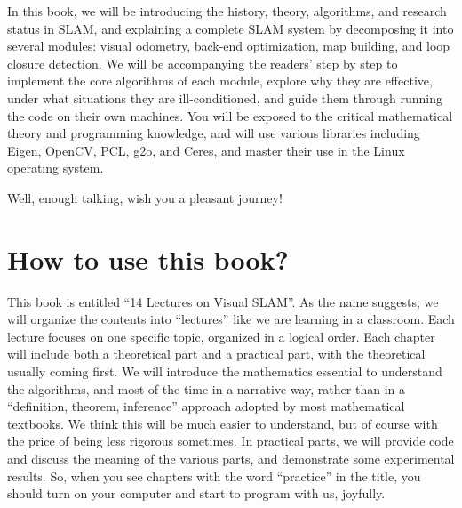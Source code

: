 In this book, we will be introducing the history, theory, algorithms, and research status in SLAM, and explaining a complete SLAM system by decomposing it into several modules: visual odometry, back-end optimization, map building, and loop closure detection. We will be accompanying the readers' step by step to implement the core algorithms of each module, explore why they are effective, under what situations they are ill-conditioned, and guide them through running the code on their own machines. You will be exposed to the critical mathematical theory and programming knowledge, and will use various libraries including Eigen, OpenCV, PCL, g2o, and Ceres, and master their use in the Linux operating system.

Well, enough talking, wish you a pleasant journey!

\section{How to use this book?}

This book is entitled ``14 Lectures on Visual SLAM''. As the name suggests, we will organize the contents into ``lectures'' like we are learning in a classroom. Each lecture focuses on one specific topic, organized in a logical order. Each chapter will include both a theoretical part and a practical part, with the theoretical usually coming first. We will introduce the mathematics essential to understand the algorithms, and most of the time in a narrative way, rather than in a ``definition, theorem, inference'' approach adopted by most mathematical textbooks. We think this will be much easier to understand, but of course with the price of being less rigorous sometimes. In practical parts, we will provide code and discuss the meaning of the various parts, and demonstrate some experimental results. So, when you see chapters with the word ``practice'' in the title, you should turn on your computer and start to program with us, joyfully.

